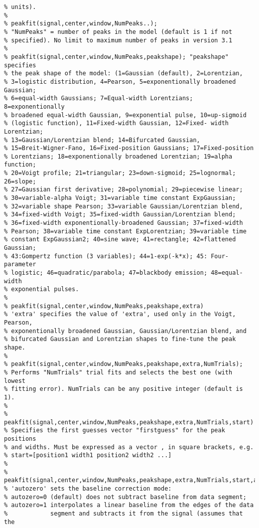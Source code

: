 \begin{lstlisting}
% units).
% 
% peakfit(signal,center,window,NumPeaks..);
% "NumPeaks" = number of peaks in the model (default is 1 if not
% specified). No limit to maximum number of peaks in version 3.1
% 
% peakfit(signal,center,window,NumPeaks,peakshape); "peakshape" specifies
% the peak shape of the model: (1=Gaussian (default), 2=Lorentzian,
% 3=logistic distribution, 4=Pearson, 5=exponentionally broadened Gaussian;
% 6=equal-width Gaussians; 7=Equal-width Lorentzians; 8=exponentionally
% broadened equal-width Gaussian, 9=exponential pulse, 10=up-sigmoid
% (logistic function), 11=Fixed-width Gaussian, 12=Fixed- width Lorentzian;
% 13=Gaussian/Lorentzian blend; 14=Bifurcated Gaussian,
% 15=Breit-Wigner-Fano, 16=Fixed-position Gaussians; 17=Fixed-position 
% Lorentzians; 18=exponentionally broadened Lorentzian; 19=alpha function; 
% 20=Voigt profile; 21=triangular; 23=down-sigmoid; 25=lognormal; 26=slope;
% 27=Gaussian first derivative; 28=polynomial; 29=piecewise linear;
% 30=variable-alpha Voigt; 31=variable time constant ExpGaussian;
% 32=variable shape Pearson; 33=variable Gaussian/Lorentzian blend,
% 34=fixed-width Voigt; 35=fixed-width Gaussian/Lorentzian blend; 
% 36=fixed-width exponentionally-broadened Gaussian; 37=fixed-width 
% Pearson; 38=variable time constant ExpLorentzian; 39=variable time
% constant ExpGaussian2; 40=sine wave; 41=rectangle; 42=flattened Gaussian;
% 43:Gompertz function (3 variables); 44=1-exp(-k*x); 45: Four-parameter
% logistic; 46=quadratic/parabola; 47=blackbody emission; 48=equal-width
% exponential pulses.
%
% peakfit(signal,center,window,NumPeaks,peakshape,extra) 
% 'extra' specifies the value of 'extra', used only in the Voigt, Pearson,
% exponentionally broadened Gaussian, Gaussian/Lorentzian blend, and
% bifurcated Gaussian and Lorentzian shapes to fine-tune the peak shape.
% 
% peakfit(signal,center,window,NumPeaks,peakshape,extra,NumTrials);
% Performs "NumTrials" trial fits and selects the best one (with lowest
% fitting error). NumTrials can be any positive integer (default is 1).
%
% peakfit(signal,center,window,NumPeaks,peakshape,extra,NumTrials,start)
% Specifies the first guesses vector "firstguess" for the peak positions
% and widths. Must be expressed as a vector , in square brackets, e.g.
% start=[position1 width1 position2 width2 ...]
% 
% peakfit(signal,center,window,NumPeaks,peakshape,extra,NumTrials,start,autozero) 
% 'autozero' sets the baseline correction mode:
% autozero=0 (default) does not subtract baseline from data segment; 
% autozero=1 interpolates a linear baseline from the edges of the data 
%            segment and subtracts it from the signal (assumes that the 

\end{lstlisting}
